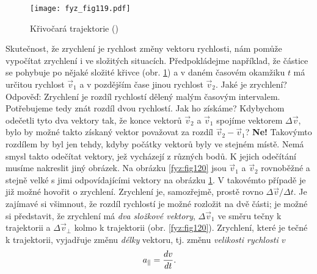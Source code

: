     \begin{figure}[ht!]  %
      \centering
      \texttt{[image: fyz\_fig119.pdf]}
      \caption{Křivočará trajektorie (\cite[s.~163]{Feynman01})}
      \label{fyz:fig119}
    \end{figure}
    Skutečnost, že zrychlení je rychlost změny vektoru rychlosti, nám pomůže vypočítat zrychlení i 
    ve složitých situacích. Předpokládejme například, že částice se pohybuje po nějaké složité 
    křivce (obr. \ref{fyz:fig119}) a v daném časovém okamžiku \(t\) má určitou rychlost 
    \(\vec{v}_1\) a v pozdějším čase jinou rychlost \(\vec{v}_2\). Jaké je zrychlení? Odpověď: 
    Zrychlení je rozdíl rychlostí dělený malým časovým intervalem. Potřebujeme tedy znát rozdíl 
    dvou rychlostí. Jak ho získáme? Kdybychom odečetli tyto dva vektory tak, že konce vektorů 
    \(\vec{v}_2\) a \(\vec{v}_1\) spojíme vektorem \(\Delta \vec{v}\), bylo by možné takto získaný 
    vektor považovat za rozdíl \(\vec{v}_2 - \vec{v}_1\)? \textbf{Ne!} Takovýmto rozdílem by byl 
    jen tehdy, kdyby počátky vektorů byly ve stejném místě. Nemá smysl takto odečítat vektory, jež 
    vycházejí z různých bodů. K jejich odečítání musíme nakreslit jiný obrázek. Na obrázku 
    \ref{fyz:fig120} jsou \(\vec{v}_1\) a \(\vec{v}_2\) rovnoběžné a stejně velké s jimi 
    odpovídajícími vektory na obrázku \ref{fyz:fig119}. V takovémto případě je již možné hovořit o 
    zrychlení. Zrychlení je, samozřejmě, prostě rovno \(\Delta\vec{v}/\Delta t\). Je zajímavé si 
    všimnout, že rozdíl rychlostí je možné rozložit na dvě části; je možné si představit, že 
    zrychlení má \emph{dva složkové vektory}, \(\Delta\vec{v}_1\) ve směru tečny k trajektorii a 
    \(\Delta\vec{v}_\perp\) kolmo k trajektorii (obr. \ref{fyz:fig120}). Zrychlení, které je tečné 
    k trajektorii, vyjadřuje změnu \emph{délky} vektoru, tj. změnu \emph{velikosti rychlosti \(v\)}
    \begin{equation}\label{fyz:eq153}
      a_\parallel = \dfrac{d v}{d t}.
    \end{equation}

